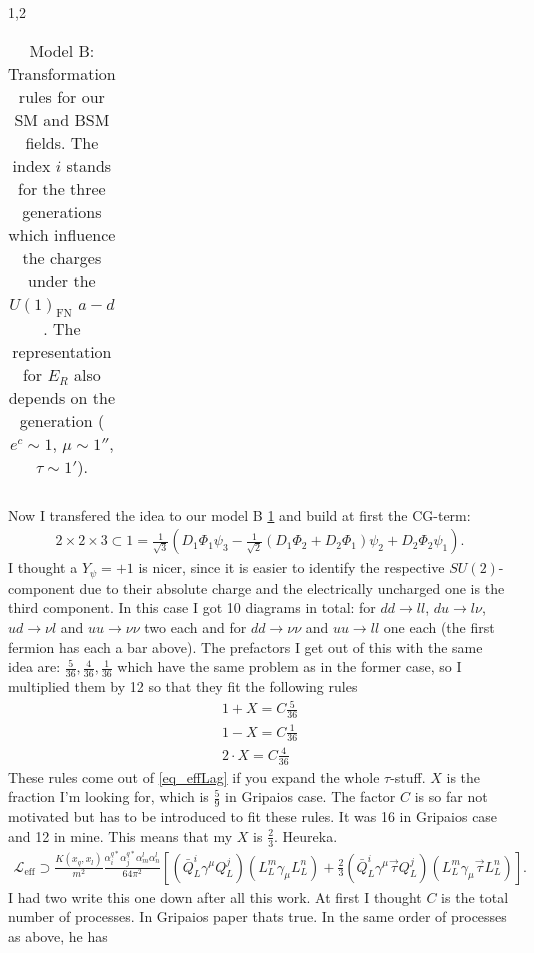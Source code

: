 \documentclass[11pt,a4paper,twoside]{article}
\begin{document}
\begin{spacing}{1,2}
\begin{table}[ht]
\begin{tabular}{c|c|c|c}
 \end{tabular}
\caption{Model B: Transformation rules for our SM and BSM fields. The index $i$ stands for the three generations which influence the charges under the 
$U(1)_\text{FN}$ $a-d$. The representation for $E_R$ also depends on the generation ($e^c \sim 1$, $\mu \sim 1''$, $\tau \sim 1'$).}
\label{tab_modelb}
\end{table}
\noindent Now I transfered the idea to our model B \ref{tab_modelb} and build at first the CG-term:
\begin{align}
 2\times2\times3 \subset 1 = \frac{1}{\sqrt{3}}\left(D_1\Phi_1\psi_3 - \frac{1}{\sqrt{2}}\left(D_1\Phi_2+D_2\Phi_1 \right)\psi_2 + D_2\Phi_2\psi_1 \right).
\end{align}
I thought a $Y_\psi = +1$ is nicer, since it is easier to identify the respective $SU(2)$-component due to their absolute charge and the electrically uncharged
one is the third component. In this case I got 10 diagrams in total: for $dd\rightarrow ll$, $du\rightarrow l\nu$, $ud\rightarrow \nu l$ and $uu\rightarrow \nu\nu$
two each and for $dd\rightarrow \nu\nu$ and $uu\rightarrow ll$ one each (the first fermion has each a bar above). The prefactors I get out of this with the same idea are: 
$\frac{5}{36}, \frac{4}{36}, \frac{1}{36}$ which have the same problem as in the former case, so I multiplied them by 12 so that they fit the following rules
\begin{align}
 1+X=C\frac{5}{36}\\
 1-X=C\frac{1}{36}\\
 2\cdot X = C\frac{4}{36}
\end{align}
These rules come out of \eqref{eq_effLag} if you expand the whole $\tau$-stuff. $X$ is the fraction I'm looking for, which is $\frac59$ in Gripaios case.
The factor $C$ is so far not motivated but has to be introduced to fit these rules. It was 16 in Gripaios case and 12 in mine. This means that my $X$ is
$\frac23$. Heureka. 
\begin{align}
 \mathcal{L}_\text{eff} \supset \frac{K(x_q,x_l)}{m^2}\frac{\alpha_i^{q*} \alpha_j^{q*} \alpha_m^l \alpha_n^l}{64\pi^2}\left[\left(\bar Q^i_L\gamma^\mu Q^j_L\right)\left(L^m_L\gamma_\mu L^n_L\right)+\frac23\left(\bar Q^i_L\gamma^\mu \vec \tau Q^j_L\right)\left(L^m_L\gamma_\mu \vec \tau L^n_L\right)\right].
 \label{eq_effLagMine}
\end{align}
I had two write this one down after all this work. 
At first I thought $C$ is the total number of processes. In Gripaios paper thats true. In the same order of processes as above, he has

\end{spacing}
\end{document}
